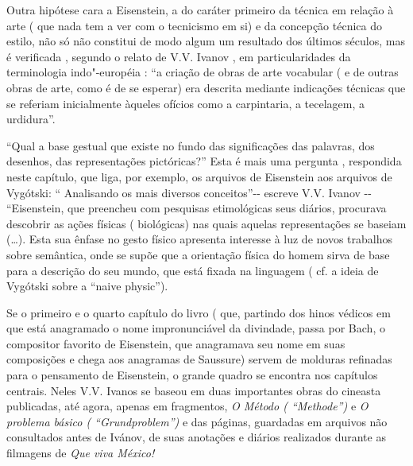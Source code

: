 Outra hipótese cara a Eisenstein, a do caráter primeiro da técnica em
relação à arte ( que nada tem a ver com o tecnicismo em si) e da
concepção técnica do estilo, não só não constitui de modo algum um
resultado dos últimos séculos, mas é verificada , segundo o relato de
V.V. Ivanov , em particularidades da terminologia indo"-européia : ``a
criação de obras de arte vocabular ( e de outras obras de arte, como é
de se esperar) era descrita mediante indicações técnicas que se referiam
inicialmente àqueles ofícios como a carpintaria, a tecelagem, a
urdidura''.

``Qual a base gestual que existe no fundo das significações das
palavras, dos desenhos, das representações pictóricas?'' Esta é mais uma
pergunta , respondida neste capítulo, que liga, por exemplo, os arquivos
de Eisenstein aos arquivos de Vygótski: `` Analisando os mais diversos
conceitos''-\/- escreve V.V. Ivanov -\/- ``Eisenstein, que preencheu com
pesquisas etimológicas seus diários, procurava descobrir as ações
físicas ( biológicas) nas quais aquelas representações se baseiam (\ldots{}).
Esta sua ênfase no gesto físico apresenta interesse à luz de novos
trabalhos sobre semântica, onde se supõe que a orientação física do
homem sirva de base para a descrição do seu mundo, que está fixada na
linguagem ( cf. a ideia de Vygótski sobre a ``naive physic'').

Se o primeiro e o quarto capítulo do livro ( que, partindo dos hinos
védicos em que está anagramado o nome impronunciável da divindade, passa
por Bach, o compositor favorito de Eisenstein, que anagramava seu nome
em suas composições e chega aos anagramas de Saussure) servem de
molduras refinadas para o pensamento de Eisenstein, o grande quadro se
encontra nos capítulos centrais. Neles V.V. Ivanos se baseou em duas
importantes obras do cineasta publicadas, até agora, apenas em
fragmentos, \emph{O Método ( ``Methode'')} e \emph{O problema básico (
``Grundproblem'')} e das páginas, guardadas em arquivos não consultados
antes de Ivánov, de suas anotações e diários realizados durante as
filmagens de \emph{Que viva México!}


